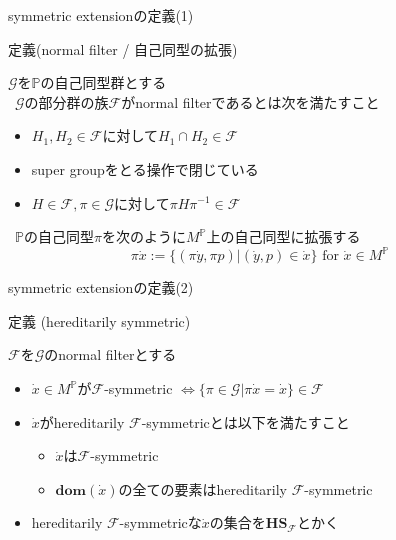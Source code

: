 \documentclass[17pt,aspectratio=169]{beamer}
\newcommand{\Pbb}{\mathbb{P}}
\newcommand{\Gcal}{\mathcal{G}}
\newcommand{\Fcal}{\mathcal{F}}
\begin{document}
\begin{frame}{symmetric extensionの定義(1)}
    \vspace{-7pt}
    \begin{itembox}[l]{定義(normal filter / {\small 自己同型の拡張})}
        {\small
            $\Gcal$を$\Pbb$の自己同型群とする  \\
            \textbullet\,\,\,$\Gcal$の部分群の族$\Fcal$がnormal filterであるとは次を満たすこと
            \vspace{-5pt}
            \begin{itemize}[left=1cm]
                \setlength{\itemsep}{0pt}
                \item [\textasteriskcentered] $H_1, H_2 \in \Fcal$に対して$H_1 \cap H_2 \in \Fcal$
                \item [\textasteriskcentered] super groupをとる操作で閉じている
                \item [\textasteriskcentered] $H \in \Fcal, \pi \in \Gcal$に対して$\pi H \pi^{-1} \in \Fcal$
            \end{itemize}
            \vspace{-3pt}
            \textbullet \,\,\,$\Pbb$の自己同型$\pi$を次のように$M^\Pbb$上の自己同型に拡張する
            \vspace{-5pt}
            $$ \pi \dot{x} := \{ (\pi \dot{y}, \pi p) | (\dot{y}, p) \in \dot{x} \} \text{ for } \dot{x} \in M^\Pbb $$
        }
            
    \end{itembox}
\end{frame}

\begin{frame}{symmetric extensionの定義(2)}
    \begin{itembox}[l]{定義 (hereditarily symmetric)}
        {\small
            $\Fcal$を$\Gcal$のnormal filterとする
            \vspace{5pt}
            \begin{itemize}
                \setlength{\itemsep}{2pt}
                \vspace{-10pt}
                \item $\dot{x} \in M^\Pbb$が$\Fcal$-symmetric $\Leftrightarrow \{ \pi \in \Gcal | \pi \dot{x} = \dot{x} \} \in \Fcal$
                \item $\dot{x}$がhereditarily $\Fcal$-symmetricとは以下を満たすこと
                      \vspace{-3pt}
                      \begin{itemize}
                          \item $\dot{x}$は$\Fcal$-symmetric
                          \item $\bm{\mathbf{dom}}(\dot{x})$の全ての要素はhereditarily $\Fcal$-symmetric
                      \end{itemize}
                \item hereditarily $\Fcal$-symmetricな$\dot{x}$の集合を$\bm{\mathbf{HS}}_{\Fcal}$とかく

            \end{itemize}
        }
    \end{itembox}
\end{frame}
\end{document}
